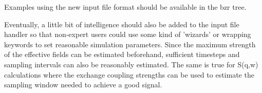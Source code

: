 \documentclass{article}
\begin{document}
Examples using the new input file format should be available in the bzr tree.
\par
Eventually, a little bit of intelligence should also be added to the input file handler so that non-expert users could use some kind of 'wizards' or wrapping keywords to set reasonable simulation parameters. Since the maximum strength of the effective fields can be estimated beforehand, sufficient timesteps and sampling intervals can also be reasonably estimated. The same is true for S(q,w) calculations where the exchange coupling strengths can be used to estimate the sampling window needed to achieve a good signal. 
\end{document}
